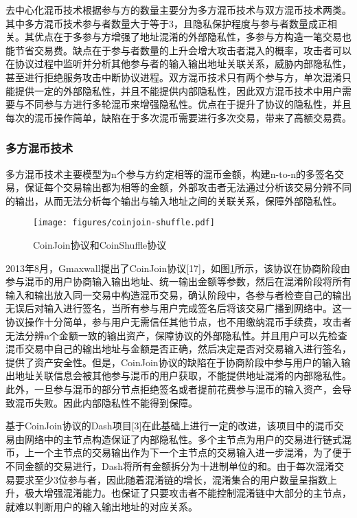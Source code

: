 去中心化混币技术根据参与方的数量主要分为多方混币技术与双方混币技术两类。其中多方混币技术参与者数量大于等于3，且隐私保护程度与参与者数量成正相关。其优点在于多参与方增强了地址混淆的外部隐私性，多参与方构造一笔交易也能节省交易费。缺点在于参与者数量的上升会增大攻击者混入的概率，攻击者可以在协议过程中监听并分析其他参与者的输入输出地址关联关系，威胁内部隐私性，甚至进行拒绝服务攻击中断协议进程。双方混币技术只有两个参与方，单次混淆只能提供一定的外部隐私性，并且不能提供内部隐私性，因此双方混币技术中用户需要与不同参与方进行多轮混币来增强隐私性。优点在于提升了协议的隐私性，并且每次的混币操作简单，缺陷在于多次混币需要进行多次交易，带来了高额交易费。

\subsubsection{多方混币技术}
多方混币技术主要模型为n个参与方约定相等的混币金额，构建n-to-n的多签名交易，保证每个交易输出都为相等的金额，外部攻击者无法通过分析该交易分辨不同的输出，从而无法分析每个输出与输入地址之间的关联关系，保障外部隐私性。

\begin{figure}
\centering
\texttt{[image: figures/coinjoin-shuffle.pdf]}
\caption{CoinJoin协议和CoinShuffle协议}
\label{fig:coinjoin-shuffle}
\end{figure}

2013年8月，Gmaxwall提出了CoinJoin协议[17]，如图\ref{fig:coinjoin-shuffle}所示，该协议在协商阶段由参与混币的用户协商输入输出地址、统一输出金额等参数，然后在混淆阶段将所有输入和输出放入同一交易中构造混币交易，确认阶段中，各参与者检查自己的输出无误后对输入进行签名，当所有参与用户完成签名后将该交易广播到网络中。这一协议操作十分简单，参与用户无需信任其他节点，也不用缴纳混币手续费，攻击者无法分辨n个金额一致的输出资产，保障协议的外部隐私性。并且用户可以先检查混币交易中自己的输出地址与金额是否正确，然后决定是否对交易输入进行签名，提供了资产安全性。但是，CoinJoin协议的缺陷在于协商阶段中参与用户的输入输出地址关联信息会被其他参与混币的用户获取，不能提供地址混淆的内部隐私性。此外，一旦参与混币的部分节点拒绝签名或者提前花费参与混币的输入资产，会导致混币失败。因此内部隐私性不能得到保障。

基于CoinJoin协议的Dash项目[3]在此基础上进行一定的改进，该项目中的混币交易由网络中的主节点构造保证了内部隐私性。多个主节点为用户的交易进行链式混币，上一个主节点的交易输出作为下一个主节点的交易输入进一步混淆，为了便于不同金额的交易进行，Dash将所有金额拆分为十进制单位的和。由于每次混淆交易要求至少3位参与者，因此随着混淆链的增长，混淆集合的用户数量呈指数上升，极大增强混淆能力。也保证了只要攻击者不能控制混淆链中大部分的主节点，就难以判断用户的输入输出地址的对应关系。

